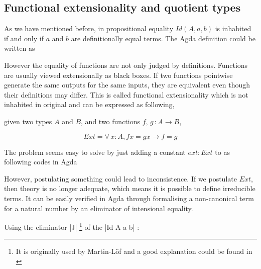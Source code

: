 \subsection{Functional extensionality and quotient types}

As we have mentioned before, in \itt{} propositional equality $Id(A,a,b)$ is inhabited
if and only if $a$ and $b$ are definitionally equal terms. The Agda
definition could be written as




However the equality of functions are not only judged  by
definitions. Functions are
usually viewed extensionally as black boxes. If two functions pointwise
generate the same outputs for the same inputs, they are equivalent
even though their definitions may differ. This is called
functional extensionality which is not inhabited \cite{alti:lics99} in original
\itt{} and can be expressed as following,

given two types $A$ and $B$, and two functions $f,\,g\,\colon A \to B$,

\[Ext = \forall\, x\colon A, f x = g x \to f = g\]

The problem seems easy to solve by just adding a constant $ext : Ext$
to \itt{} as following codes in Agda




However, postulating something could lead to inconsistence. If we
postulate $Ext$, then theory is no longer adequate, which means it is possible to define irreducible terms. 
It can be easily verified in Agda through formalising a non-canonical
term for a natural number by an eliminator of intensional equality. 

Using the eliminator |J| \footnote{It is originally
  used by Martin-L\"{o}f \cite{nor:90} and a good explanation could be
found in \cite{ngk:11}}  of the |Id A a b| :


